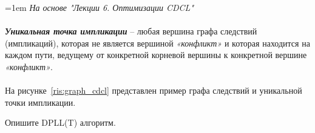 \documentclass[12pt]{extreport}
\theoremstyle{definiton}
\theoremstyle{definition}
\theoremstyle{definition}
\newcommand{\solution}[2][\color{myblue}Ответ]{
\medskip
	\noindent{\bfseries #1 }{{\color{myblue}\bfseries #2:}}
}
\newenvironment{blockquote}{%
  \par%
  \medskip
  \leftskip=1em%
  \noindent}{%
  \par\medskip}
\begin{document}
\solution{13}
\begin{blockquote}
{\color{myblue}
\textcolor{mypurpur}{\textit{На основе "Лекции 6. Оптимизации CDCL"}}\\
\\
\noindent \textbf{\textit{Уникальная точка импликации}} -- любая вершина графа  следствий (импликаций), которая не является вершиной \textit{«конфликт»} и которая находится на каждом пути, ведущему от конкретной корневой вершины к конкретной вершине \textit{«конфликт»}.\\
\\
На рисунке~\ref{ris:graph_cdcl} представлен пример графа следствий и уникальной точки импликации.
}
\end{blockquote}

\Pr[\textcolor{mygreen}{Каринэ, DONE}] Опишите DPLL(T) алгоритм.
			
\end{document}
